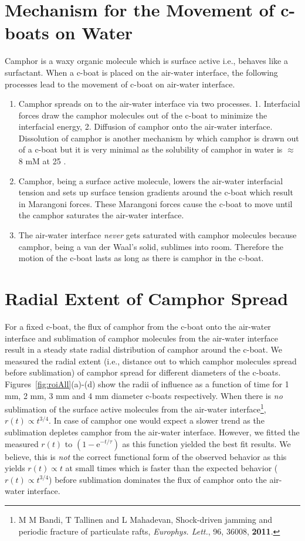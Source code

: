 \documentclass[12pt]{article}
\begin{document}
\section{Mechanism for the Movement of c-boats on Water}
Camphor is a waxy organic molecule which is surface active i.e., behaves like a surfactant. When a c-boat is placed on the air-water interface, the following processes lead to the movement of c-boat on air-water interface. 
\begin{enumerate}
\item Camphor spreads on to the air-water interface via two processes. 1. Interfacial forces draw the camphor molecules out of the c-boat to minimize the interfacial energy, 2. Diffusion of camphor onto the air-water interface. Dissolution of camphor is another mechanism by which camphor is drawn out of a c-boat but it is very minimal as the solubility of camphor in water is $\approx$ 8 mM at 25 \celsius.  
\item Camphor, being a surface active molecule, lowers the air-water interfacial tension and sets up surface tension gradients around the c-boat which result in Marangoni forces. These Marangoni forces cause the c-boat to move until the camphor saturates the air-water interface.  
\item The air-water interface \emph{never} gets saturated with camphor molecules because camphor, being a van der Waal's solid, sublimes into room. Therefore the motion of the c-boat lasts as long as there is camphor in the c-boat. 
\end{enumerate} 

\section{Radial Extent of Camphor Spread}
For a fixed c-boat, the flux of camphor from the c-boat onto the air-water interface and sublimation of camphor molecules from the air-water interface result in a steady state radial distribution of camphor around the c-boat. We measured the radial extent (i.e., distance out to which camphor molecules spread before sublimation) of camphor spread for different diameters of the c-boats. Figures~\ref{fig:roiAll}(a)-(d) show the radii of influence as a function of time for 1 mm, 2 mm, 3 mm and 4 mm diameter c-boats respectively. 
When there is \emph{no} sublimation of the surface active molecules from the air-water interface\footnote{M M Bandi, T Tallinen and L Mahadevan, Shock-driven jamming and periodic fracture of particulate rafts, \emph{Europhys. Lett.}, 96, 36008, {\bf 2011}.}, $r(t) \propto t^{3/4}$. In case of camphor one would expect a slower trend as the sublimation depletes camphor from the air-water interface. However, we fitted the measured $r(t)$ to $(1-\mathrm{e}^{-t/\tau})$ as this function yielded the best fit results. We believe, this is \emph{not} the correct functional form of the observed behavior as this yields $r(t) \propto t$ at small times which is faster than the expected behavior ($r(t) \propto t^{3/4}$) before sublimation dominates the flux of camphor onto the air-water interface. 
\end{document}
